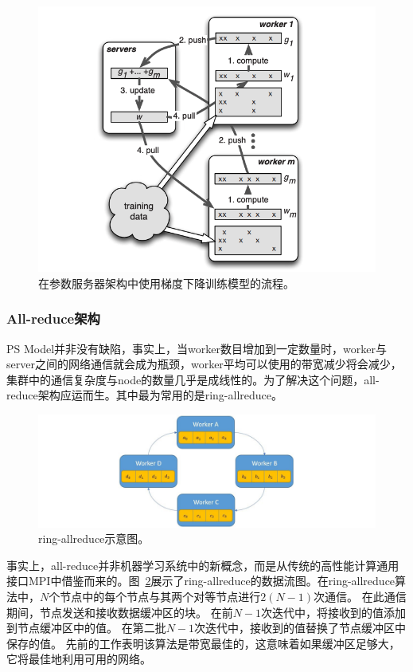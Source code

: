\begin{figure}[h]
    \centerline{\includegraphics[width=\textwidth]{figures/ps-sgd.png}}
    \caption{在参数服务器架构中使用梯度下降训练模型的流程。}
    \label{ps_sgd}
\end{figure}

\subsubsection{All-reduce架构}
PS Model并非没有缺陷，事实上，当worker数目增加到一定数量时，worker与server之间的网络通信就会成为瓶颈，worker平均可以使用的带宽减少将会减少，集群中的通信复杂度与node的数量几乎是成线性的。为了解决这个问题，all-reduce架构应运而生。其中最为常用的是ring-allreduce。

\begin{figure}[h]
    \centerline{\includegraphics[width=\textwidth]{figures/ring-allreduce.png}}
    \caption{ring-allreduce示意图。}
    \label{ring_allreduce}
\end{figure}

事实上，all-reduce并非机器学习系统中的新概念，而是从传统的高性能计算通用接口MPI\parencite{gropp1994using}中借鉴而来的。图~\ref{ring_allreduce}展示了ring-allreduce的数据流图。在ring-allreduce算法中，$N$个节点中的每个节点与其两个对等节点进行$2(N-1)$次通信。 在此通信期间，节点发送和接收数据缓冲区的块。 在前$N-1$次迭代中，将接收到的值添加到节点缓冲区中的值。 在第二批$N-1$次迭代中，接收到的值替换了节点缓冲区中保存的值。 先前的工作表明该算法是带宽最佳的，这意味着如果缓冲区足够大，它将最佳地利用可用的网络。

